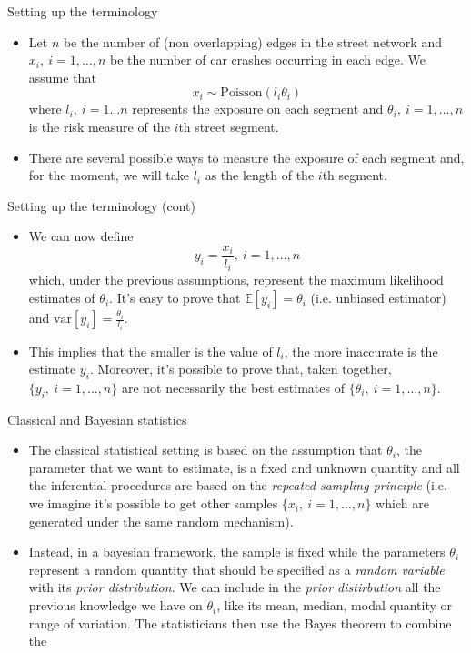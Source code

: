 \documentclass[c,10pt,pdftex]{beamer}
\begin{document}
\begin{frame}{Setting up the terminology}
\vspace{-0.75cm}
\begin{itemize}
	\setlength\itemsep{1em}
	\item  Let $n$ be the number of (non overlapping) edges in the street network and $x_i, \ i = 1,\dots,n$ be the number of car crashes occurring in each edge. We assume that
	\[
	x_i \sim \text{Poisson}(l_i\theta_i)
	\] 	
	where $l_i, \ i = 1\dots n$ represents the exposure on each segment and $\theta_i, \ i = 1, \dots, n$ is the \alert{risk measure of the $i$th street segment}. 
	\item There are several possible ways to measure the exposure of each segment and, for the moment, we will take $l_i$ as the length of the $i$th segment. 
\end{itemize}
\end{frame}

\begin{frame}{Setting up the terminology (cont)}
\vspace{-0.75cm}
\begin{itemize}
	\setlength\itemsep{1em}
	\item We can now define 
	\[
	y_{i} = \frac{x_i}{l_i}, \ i = 1, \dots, n
	\]  
	which, under the previous assumptions, represent the maximum likelihood estimates of $\theta_i$. It's easy to prove that $\mathbb{E}[y_i] = \theta_i$ (i.e. unbiased estimator) and $\text{var}[y_i] = \frac{\theta_i}{l_i}$.
	
	\item This implies that the smaller is the value of $l_i$, the more inaccurate is the estimate $y_i$. Moreover, it's possible to prove that, taken together, $\lbrace y_i, \ i = 1,\dots,n\rbrace$ are not necessarily the best estimates of $\lbrace \theta_i, \ i = 1, \dots, n \rbrace$.   
\end{itemize}
\end{frame}

\begin{frame}{Classical and Bayesian statistics}
\vspace{-0.75cm}
\begin{itemize}
	\setlength\itemsep{1em}
	\item The classical statistical setting is based on the assumption that $\theta_i$, the parameter that we want to estimate, is a fixed and unknown quantity and all the inferential procedures are based on the \textit{repeated sampling principle} (i.e. we imagine it's possible to get other samples $\lbrace x_i, \ i = 1,\dots,n \rbrace$ which are generated under the same random mechanism). 
	\item Instead, in a bayesian framework, the sample is fixed while the parameters $\theta_i$ represent a random quantity that should be specified as a \textit{random variable} with its \textit{prior distribution}. We can include in the \textit{prior distirbution} all the previous knowledge we have on $\theta_{i}$, like its mean, median, modal quantity or range of variation. The statisticians then use the Bayes theorem to combine the 
\end{itemize}
\end{frame}
\end{document}
